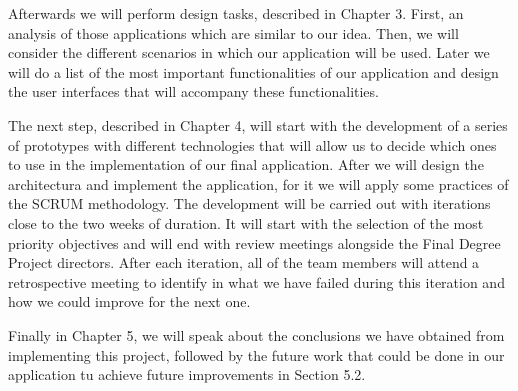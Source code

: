 Afterwards we will perform design tasks, described in Chapter 3. First, an analysis of those 
applications which are similar to our idea. Then, we will consider the different scenarios in which
our application will be used. Later we will do a list of the most important functionalities of our application 
and design the user interfaces that will accompany these functionalities.

The next step, described in Chapter 4, will start with the development of a series of prototypes with different
technologies that will allow us to decide which ones to use in the implementation of our final application. After we 
will design the architectura and implement the application, for it we will apply some practices of the SCRUM methodology. 
The development will be carried out with iterations close to the two weeks of duration. It will start with the selection 
of the most priority objectives and will end with review meetings alongside the Final Degree Project directors. After each iteration,
all of the team members will attend a retrospective meeting to identify in what we have failed during this iteration and 
how we could improve for the next one. 

Finally in Chapter 5, we will speak about the conclusions we have obtained from implementing this project, followed by the future work that
could be done in our application tu achieve future improvements in Section 5.2.
